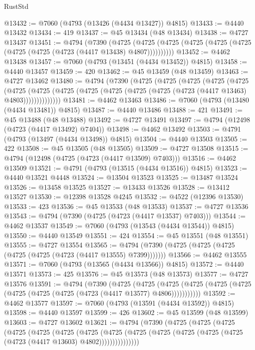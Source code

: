 \begin{lexlean}{RustStd}
\begin{coremodule}
@13432 := @7060 (@4793 (@13426 (@4434 @13427)) @4815)
@13433 := @4440 @13432
@13434 := 419
@13437 := @45 @13434 (@48 @13434)
@13438 := @4727 @13437
@13451 := @4794
    (@7390
      (@4725 (@4725 (@4725 (@4725 (@4725 (@4725 (@4725 (@4725 (@4723 (@4417 @13438) @4807))))))))))
@13452 := @4462 @13438
@13457 := @7060 (@4793 (@13451 (@4434 @13452)) @4815)
@13458 := @4440 @13457
@13459 := 420
@13462 := @45 @13459 (@48 @13459)
@13463 := @4727 @13462
@13480 := @4794
    (@7390
      (@4725
        (@4725
          (@4725
            (@4725
              (@4725
                (@4725
                  (@4725
                    (@4725 (@4725 (@4725 (@4725 (@4725 (@4723 (@4417 @13463) @4803))))))))))))))
@13481 := @4462 @13463
@13486 := @7060 (@4793 (@13480 (@4434 @13481)) @4815)
@13487 := @4440 @13486
@13488 := 421
@13491 := @45 @13488 (@48 @13488)
@13492 := @4727 @13491
@13497 := @4794 (@12498 (@4723 (@4417 @13492) @7404))
@13498 := @4462 @13492
@13503 := @4791 (@4793 (@13497 (@4434 @13498)) @4815)
@13504 := @4440 @13503
@13505 := 422
@13508 := @45 @13505 (@48 @13505)
@13509 := @4727 @13508
@13515 := @4794 (@12498 (@4725 (@4723 (@4417 @13509) @7403)))
@13516 := @4462 @13509
@13521 := @4791 (@4793 (@13515 (@4434 @13516)) @4815)
@13523 := @4440 @13521 @4448
@13524 := @13504 @13523
@13525 := @13487 @13524
@13526 := @13458 @13525
@13527 := @13433 @13526
@13528 := @13412 @13527
@13530 := @12398 @13528 @4245
@13532 := @4522 (@12396 @13530)
@13533 := 423
@13536 := @45 @13533 (@48 @13533)
@13537 := @4727 @13536
@13543 := @4794 (@7390 (@4725 (@4723 (@4417 @13537) @7403)))
@13544 := @4462 @13537
@13549 := @7060 (@4793 (@13543 (@4434 @13544)) @4815)
@13550 := @4440 @13549
@13551 := 424
@13554 := @45 @13551 (@48 @13551)
@13555 := @4727 @13554
@13565 := @4794 (@7390 (@4725 (@4725 (@4725 (@4725 (@4725 (@4723 (@4417 @13555) @7399)))))))
@13566 := @4462 @13555
@13571 := @7060 (@4793 (@13565 (@4434 @13566)) @4815)
@13572 := @4440 @13571
@13573 := 425
@13576 := @45 @13573 (@48 @13573)
@13577 := @4727 @13576
@13591 := @4794
    (@7390
      (@4725
        (@4725
          (@4725 (@4725 (@4725 (@4725 (@4725 (@4725 (@4725 (@4723 (@4417 @13577) @4806)))))))))))
@13592 := @4462 @13577
@13597 := @7060 (@4793 (@13591 (@4434 @13592)) @4815)
@13598 := @4440 @13597
@13599 := 426
@13602 := @45 @13599 (@48 @13599)
@13603 := @4727 @13602
@13621 := @4794
    (@7390
      (@4725
        (@4725
          (@4725
            (@4725
              (@4725
                (@4725
                  (@4725
                    (@4725
                      (@4725 (@4725 (@4725 (@4725 (@4725 (@4723 (@4417 @13603) @4802)))))))))))))))

\end{coremodule}
\end{lexlean}
